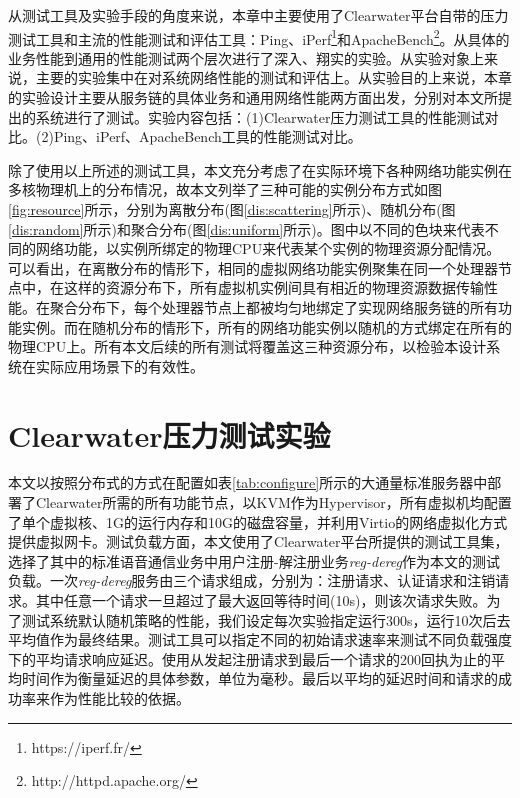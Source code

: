 从测试工具及实验手段的角度来说，本章中主要使用了Clearwater平台自带的压力测试工具和主流的性能测试和评估工具：Ping、iPerf\footnote{https://iperf.fr/}和ApacheBench\footnote{http://httpd.apache.org/}。从具体的业务性能到通用的性能测试两个层次进行了深入、翔实的实验。从实验对象上来说，主要的实验集中在对系统网络性能的测试和评估上。从实验目的上来说，本章的实验设计主要从服务链的具体业务和通用网络性能两方面出发，分别对本文所提出的系统进行了测试。实验内容包括：(1)Clearwater压力测试工具的性能测试对比。(2)Ping、iPerf、ApacheBench工具的性能测试对比。

\begin{figure}[!htp]
	\centering
\end{figure}

除了使用以上所述的测试工具，本文充分考虑了在实际环境下各种网络功能实例在多核物理机上的分布情况，故本文列举了三种可能的实例分布方式如图 \ref{fig:resource}所示，分别为离散分布(图\ref{dis:scattering}所示)、随机分布(图\ref{dis:random}所示)和聚合分布(图\ref{dis:uniform}所示)。图中以不同的色块来代表不同的网络功能，以实例所绑定的物理CPU来代表某个实例的物理资源分配情况。可以看出，在离散分布的情形下，相同的虚拟网络功能实例聚集在同一个处理器节点中，在这样的资源分布下，所有虚拟机实例间具有相近的物理资源数据传输性能。在聚合分布下，每个处理器节点上都被均匀地绑定了实现网络服务链的所有功能实例。而在随机分布的情形下，所有的网络功能实例以随机的方式绑定在所有的物理CPU上。所有本文后续的所有测试将覆盖这三种资源分布，以检验本设计系统在实际应用场景下的有效性。

\section{Clearwater压力测试实验}
本文以按照分布式的方式在配置如表\ref{tab:configure}所示的大通量标准服务器中部署了Clearwater所需的所有功能节点，以KVM作为Hypervisor，所有虚拟机均配置了单个虚拟核、1G的运行内存和10G的磁盘容量，并利用Virtio的网络虚拟化方式提供虚拟网卡。测试负载方面，本文使用了Clearwater平台所提供的测试工具集，选择了其中的标准语音通信业务中用户注册-解注册业务\textit{reg-dereg}作为本文的测试负载。一次\textit{reg-dereg}服务由三个请求组成，分别为：注册请求、认证请求和注销请求。其中任意一个请求一旦超过了最大返回等待时间(10s)，则该次请求失败。为了测试系统默认随机策略的性能，我们设定每次实验指定运行300s，运行10次后去平均值作为最终结果。测试工具可以指定不同的初始请求速率来测试不同负载强度下的平均请求响应延迟。使用从发起注册请求到最后一个请求的200回执为止的平均时间作为衡量延迟的具体参数，单位为毫秒。最后以平均的延迟时间和请求的成功率来作为性能比较的依据。

